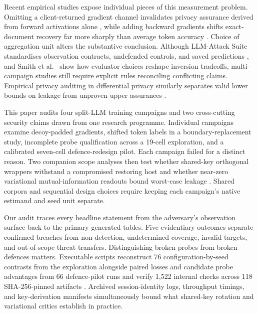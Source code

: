 \documentclass[11pt]{article}
\begin{document}
Recent empirical studies expose individual pieces of this measurement
problem. Omitting a client-returned gradient channel invalidates privacy
assurance derived from forward activations alone \cite{paper1}, while adding
backward gradients shifts exact-document recovery far more sharply than
average token accuracy \cite{gradients2026}. Choice of aggregation unit
alters the substantive conclusion. Although LLM-Attack Suite standardises
observation contracts, undefended controls, and saved predictions
\cite{suite2026}, and Smith et al.\ \cite{mia2026} show how evaluator
choices reshape inversion tradeoffs, multi-campaign studies still require
explicit rules reconciling conflicting claims. Empirical privacy auditing in
differential privacy similarly separates valid lower bounds on leakage from
unproven upper assurances \cite{jagielski2020}.

This paper audits four split-LLM training campaigns and two cross-cutting
security claims drawn from one research programme. Individual campaigns
examine decoy-padded gradients, shifted token labels in a
boundary-replacement study, incomplete probe qualification across a 19-cell
exploration, and a calibrated seven-cell defence-redesign pilot. Each
campaign failed for a distinct reason. Two companion scope analyses then
test whether shared-key orthogonal wrappers withstand a compromised
restoring host \cite{permattack2025,privpair2026} and whether near-zero
variational mutual-information readouts bound worst-case leakage
\cite{mcallester2020,song2020}. Shared corpora and sequential design choices
require keeping each campaign's native estimand and seed unit separate.

Our audit traces every headline statement from the adversary's observation
surface back to the primary generated tables. Five evidentiary outcomes
separate confirmed breaches from non-detection, undetermined coverage,
invalid targets, and out-of-scope threat transfers. Distinguishing broken
probes from broken defences matters. Executable scripts reconstruct 76
configuration-by-seed contrasts from the exploration alongside paired losses
and candidate probe advantages from 66 defence-pilot runs and verify 1,522
internal checks across 118 SHA-256-pinned artifacts \cite{artifacts2026}.
Archived session-identity logs, throughput timings, and key-derivation
manifests simultaneously bound what shared-key rotation and variational
critics establish in practice.






\appendix

\FloatBarrier


\end{document}
